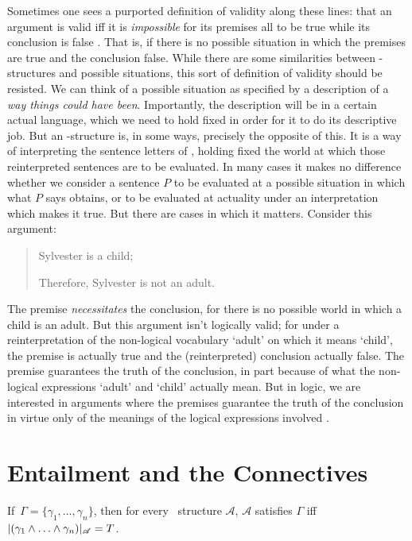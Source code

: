  Sometimes one sees a purported definition of validity along these lines: that an argument is valid iff it is \emph{impossible} for its premises all to be true while its conclusion is false \citep[19]{sweetreas}. That is, if there is no possible situation in which the premises are true and the conclusion false. While there are some similarities between \lone-structures and possible situations, this sort of definition of validity should be resisted. We can think of a possible situation as specified by a description of a \emph{way things could have been}. Importantly, the description will be in a certain actual language, which we need to hold fixed in order for it to do its descriptive job. But an \lone-structure is, in some ways, precisely the opposite of this. It is a way of interpreting the sentence letters of \lone, holding fixed the world at which those reinterpreted sentences are to be evaluated. In many cases it makes no difference whether we consider a sentence $P$ to be evaluated at a possible situation in which what $P$ says obtains, or to be evaluated at actuality under an interpretation which makes it true. But there are cases in which it matters. Consider this argument: \begin{quotation}
	Sylvester is a child;

	Therefore, Sylvester is not an adult.
\end{quotation}
The premise \emph{necessitates} the conclusion, for there is no possible world in which a child is an adult. But this argument isn't logically valid; for under a reinterpretation of the non-logical vocabulary ‘adult’ on which it means ‘child’, the premise is actually true and the (reinterpreted) conclusion actually false. The premise guarantees the truth of the conclusion, in part because of what the non-logical expressions ‘adult’ and ‘child’ actually mean. But in logic, we are interested in arguments where the premises guarantee the truth of the conclusion in virtue only of the meanings of the logical expressions involved \citep{tarski}.




 \section{Entailment and the Connectives}
\begin{theorem}
	If\, $\Gamma = \{\gamma_{1},\ldots,\gamma_{n}\}$, then for every \lone\ structure $\mathscr{A}$, $\mathscr{A}$ satisfies $\Gamma$ iff $|(\gamma_{1}\wedge\ldots\wedge\gamma_{n})|_{\mathscr{A}}=T$.\label{cone}
\end{theorem}

